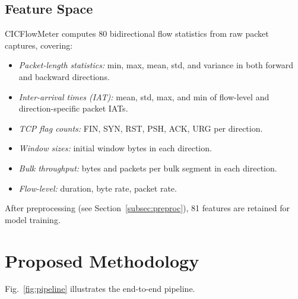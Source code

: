 \documentclass[conference]{IEEEtran}
\begin{document}
\subsection{Feature Space}

CICFlowMeter computes 80 bidirectional flow statistics from raw packet
captures, covering:
\begin{itemize}
  \item \textit{Packet-length statistics:} min, max, mean, std, and
        variance in both forward and backward directions.
  \item \textit{Inter-arrival times (IAT):} mean, std, max, and min
        of flow-level and direction-specific packet IATs.
  \item \textit{TCP flag counts:} FIN, SYN, RST, PSH, ACK, URG per
        direction.
  \item \textit{Window sizes:} initial window bytes in each direction.
  \item \textit{Bulk throughput:} bytes and packets per bulk segment
        in each direction.
  \item \textit{Flow-level:} duration, byte rate, packet rate.
\end{itemize}
After preprocessing (see Section~\ref{subsec:preproc}), 81 features
are retained for model training.

\section{Proposed Methodology}
\label{sec:method}

Fig.~\ref{fig:pipeline} illustrates the end-to-end pipeline.
\end{document}
